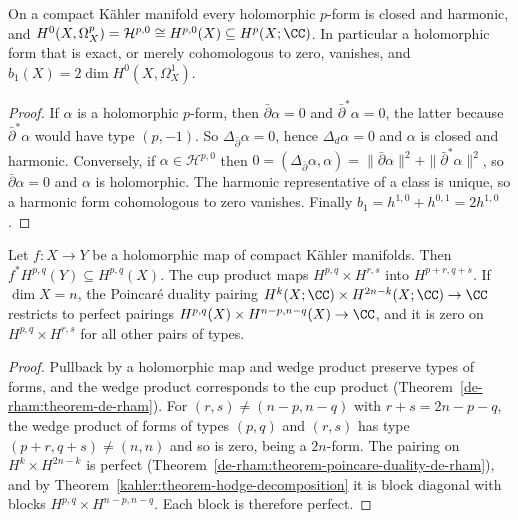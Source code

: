 \begin{proposition}\label{kahler:proposition-holomorphic-forms}
On a compact K\"ahler manifold every holomorphic $p$-form is closed and harmonic, and
$H^0(X, \Omega^p_X) = \mathcal{H}^{p,0} \cong H^{p,0}(X) \subseteq H^p(X; \CC)$. In particular a holomorphic form that is exact, or
merely cohomologous to zero, vanishes, and $b_1(X) = 2\dim H^0(X, \Omega^1_X)$.
\end{proposition}

\begin{proof}
If $\alpha$ is a holomorphic $p$-form, then $\bar\partial\alpha = 0$ and $\bar\partial^*\alpha = 0$, the latter because
$\bar\partial^*\alpha$ would have type $(p, -1)$. So $\Delta_{\bar\partial}\alpha = 0$, hence $\Delta_d\alpha = 0$ and $\alpha$ is closed
and harmonic. Conversely, if $\alpha \in \mathcal{H}^{p,0}$ then
$0 = (\Delta_{\bar\partial}\alpha, \alpha) = \|\bar\partial\alpha\|^2 + \|\bar\partial^*\alpha\|^2$, so $\bar\partial\alpha = 0$ and $\alpha$ is holomorphic. The
harmonic representative of a class is unique, so a harmonic form cohomologous to zero vanishes. Finally $b_1 = h^{1,0} + h^{0,1} = 2h^{1,0}$.
\end{proof}

\begin{proposition}\label{kahler:proposition-functoriality}
Let $f \colon X \to Y$ be a holomorphic map of compact K\"ahler manifolds. Then $f^*H^{p,q}(Y) \subseteq H^{p,q}(X)$. The cup product
maps $H^{p,q} \times H^{r,s}$ into $H^{p+r,q+s}$. If $\dim X = n$, the Poincar\'e duality pairing
$H^k(X; \CC) \times H^{2n-k}(X; \CC) \to \CC$ restricts to perfect pairings $H^{p,q}(X) \times H^{n-p,n-q}(X) \to \CC$, and it is zero on
$H^{p,q} \times H^{r,s}$ for all other pairs of types.
\end{proposition}

\begin{proof}
Pullback by a holomorphic map and wedge product preserve types of forms, and the wedge product corresponds to the cup product
(Theorem~\ref{de-rham:theorem-de-rham}). For $(r,s) \neq (n-p, n-q)$ with $r + s = 2n - p - q$, the wedge product of forms of types
$(p,q)$ and $(r,s)$ has type $(p+r, q+s) \neq (n,n)$ and so is zero, being a $2n$-form. The pairing on $H^k \times H^{2n-k}$ is perfect
(Theorem~\ref{de-rham:theorem-poincare-duality-de-rham}), and by
Theorem~\ref{kahler:theorem-hodge-decomposition} it is block diagonal with blocks $H^{p,q} \times H^{n-p,n-q}$. Each block
is therefore perfect.
\end{proof}

